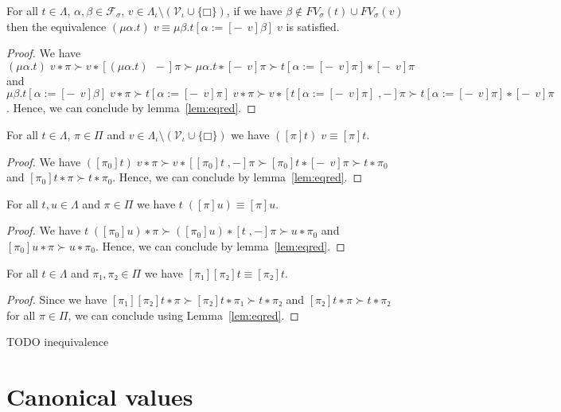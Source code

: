 \begin{theorem}
  For all $t ∈ Λ$, $α, β ∈ \mathcal{F}_{σ}$, $v ∈ Λ_{ι} \setminus
  (\mathcal{V}_{ι} ∪ \{□\})$, if we have $β \notin FV_σ(t) ∪ FV_σ(v)$ then
  the equivalence $(μα.t)\;v ≡ μβ.t[α := [{-}\;\,v]β]\;v$ is satisfied.
\end{theorem}
\begin{proof}
  We have ${(μα.t)\;v ∗ π} ≻ {v ∗ [(μα.t) \;\,{-}]\pi} ≻ {μα.t∗[{-}\;\,v]\pi}
  ≻ {t[α:= [{-}\;\,v]\pi]∗[{-}\;\,v]\pi}$ and
  ${μβ.t[α := [{-}\;\,v]β]\;v∗ π}  ≻ {t[α := [{-}\;\,v]π]\;v∗ π}
  ≻ {v ∗ [t[α := [{-}\;\,v]π]\;,{-}] π} ≻
  {t[α := [{-}\;\,v]π]∗[{-}\;\,v]\pi}$. Hence, we can
  conclude by lemma~\ref{lem:eqred}.
\end{proof}

\begin{theorem}
  For all $t ∈ Λ$, $π ∈ Π$ and $v ∈ Λ_{ι} \setminus (\mathcal{V}_{ι} ∪ \{□\})$
  we have $([π]t)\;v ≡ [π]t$.
\end{theorem}
\begin{proof}
  We have ${([π_0]t)\;v ∗ π} ≻ {v ∗ [[π_0]t\;,{-}] π} ≻ {[π_0]t ∗ [{-}\;\,v]\pi}
  ≻ {t ∗ π_0}$ and ${[π_0]t ∗  π} ≻ {t ∗ π_0}$. Hence, we can
  conclude by lemma~\ref{lem:eqred}.
\end{proof}

\begin{theorem}
  For all $t, u ∈ Λ$ and $π ∈ Π$ we have $t\;([π]u) ≡ [π]u$.
\end{theorem}
\begin{proof}
  We have ${t\;([π_0]u)∗ π} ≻ {([π_0]u)∗ [t\;,{-}]π} ≻ {u ∗  π_0}$ and
  ${[π_0]u∗ π} ≻ {u ∗  π_0}$. Hence, we can
  conclude by lemma~\ref{lem:eqred}.
\end{proof}

\begin{theorem}
  For all $t ∈ Λ$ and $π₁, π₂ ∈ Π$ we have $[π₁][π₂]t ≡ [π₂]t$.
\end{theorem}
\begin{proof}
  Since we have ${[π₁][π₂]t ∗ π} ≻ {[π₂]t ∗ π₁} ≻ {t ∗ π₂}$ and ${[π₂]t ∗ π} ≻
  {t ∗ π₂}$ for all $π ∈ Π$, we can conclude using Lemma~\ref{lem:eqred}.
\end{proof}

TODO inequivalence

\section{Canonical values}

